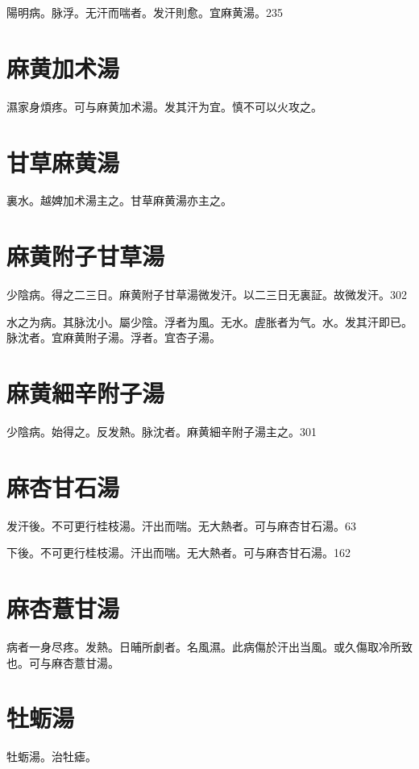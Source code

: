 \documentclass[12pt,twoside,UTF8,b5paper]{ctexbook}
\begin{document}
陽明病。脉浮。无汗而喘者。发汗則愈。宜麻黄湯。235

\section{麻黄加术湯}

濕家身煩疼。可与麻黄加术湯。发其汗为宜。慎不可以火攻之。

\section{甘草麻黄湯}

裏水。越婢加术湯主之。甘草麻黄湯亦主之。

\section{麻黄附子甘草湯}

少陰病。得之二三日。麻黄附子甘草湯微发汗。以二三日无{裏}証。故微发汗。302

水之为病。其脉沈小。屬少陰。浮者为風。无水。虗胀者为气。水。发其汗即已。脉沈者。宜麻黄附子湯。浮者。宜杏子湯。

\section{麻黄細辛附子湯}

少陰病。始得之。反发熱。脉沈者。麻黄細辛附子湯主之。301

\section{麻杏甘石湯}

发汗後。{不可更行桂枝湯。}汗出而喘。无大熱者。可与麻杏甘石湯。63

下後。{不可更行桂枝湯。}汗出而喘。无大熱者。可与麻杏甘石湯。162

\section{麻杏薏甘湯}

病者一身尽疼。发熱。日晡所劇者。名風濕。此病傷於汗出当風。或久傷取冷所致也。可与麻杏薏甘湯。

\section{牡蛎湯}

牡蛎湯。治牡瘧。
\end{document}
